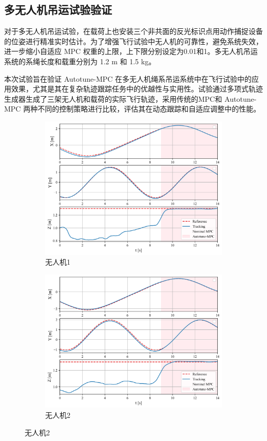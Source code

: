 \documentclass[lang=chs, degree=master, blindreview=false, winfonts=true]{yanputhesis}
\begin{document}
\subsection{多无人机吊运试验验证}
对于多无人机吊运试验，在载荷上也安装三个非共面的反光标识点用动作捕捉设备的位姿进行精准实时估计。为了增强飞行试验中无人机的可靠性，避免系统失效，进一步缩小自适应 MPC 权重的上限，上下限分别设定为0.01和1。多无人机吊运系统的系绳长度和载重分别为 1.2 m 和 1.5 kg。

本次试验旨在验证 Autotune-MPC 在多无人机绳系吊运系统中在飞行试验中的应用效果，尤其是其在复杂轨迹跟踪任务中的优越性与实用性。试验通过多项式轨迹生成器生成了三架无人机和载荷的实际飞行轨迹，采用传统的MPC和 Autotune-MPC 两种不同的控制策略进行比较，评估其在动态跟踪和自适应调整中的性能。

\begin{figure}[H]
	\centering
	\begin{subfigure}[b]{0.48\textwidth}
		\centering
		\includegraphics[width=\textwidth]{picture/kk/4.png}
		\caption{无人机1}
		\label{quadrotor00}
	\end{subfigure}
	\hfill
	\begin{subfigure}[b]{0.48\textwidth}
		\centering
		\includegraphics[width=\textwidth]{picture/kk/5.png}
		\caption{无人机2}
		\label{quadrotor01}
	\end{subfigure}
	

\end{figure}
\end{document}
